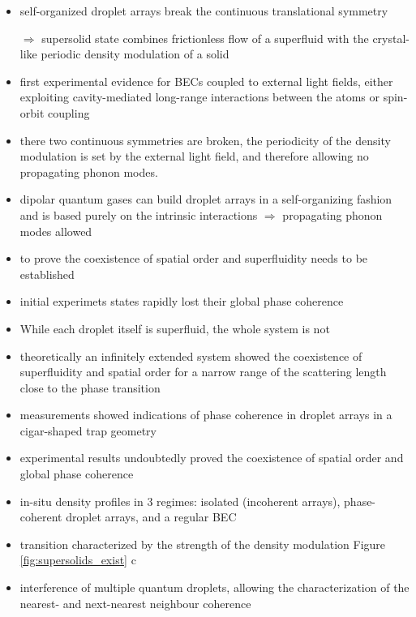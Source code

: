 \begin{itemize}
    \item self-organized droplet arrays break the continuous translational symmetry
    \item[$\Rightarrow$] supersolid state combines frictionless flow of a superfluid with the crystal-like periodic density modulation of a solid
    \item first experimental evidence for BECs coupled to external light fields, either exploiting cavity-mediated long-range interactions between the atoms or spin-orbit coupling
    \item there two continuous symmetries are broken, the periodicity of the density modulation is set by the external light field, and therefore allowing no propagating phonon modes.
    \item dipolar quantum gases can build droplet arrays in a self-organizing fashion and is based purely on the intrinsic interactions $\Rightarrow$ propagating phonon modes allowed
    \item to prove the coexistence of spatial order and superfluidity needs to be established
    \item initial experimets states rapidly lost their global phase coherence
    \item While each droplet itself is superfluid, the whole system is not
    \item theoretically an infinitely extended system showed the coexistence of superfluidity and spatial order for a narrow range of the scattering length close to the phase transition
    \item measurements showed indications of phase coherence in droplet arrays in a cigar-shaped trap geometry
    \item experimental results undoubtedly proved the coexistence of spatial order and global phase coherence
    \item in-situ density profiles in 3 regimes: isolated (incoherent arrays), phase-coherent droplet arrays, and a regular BEC
    \item transition characterized by the strength of the density modulation Figure \ref{fig:supersolids_exist} c
    \item interference of multiple quantum droplets, allowing the characterization of the nearest- and next-nearest neighbour coherence
\end{itemize}


